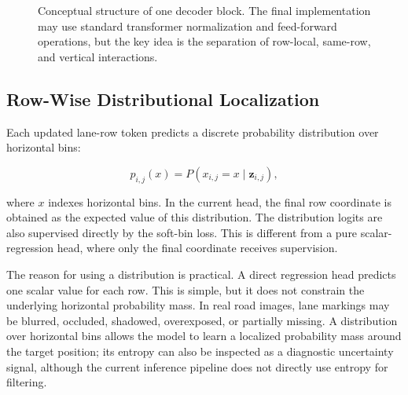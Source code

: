 \documentclass[conference]{IEEEtran}
\begin{document}
\begin{figure}[t]
\centering
{}
\caption{Conceptual structure of one decoder block. The final implementation may use standard transformer normalization and feed-forward operations, but the key idea is the separation of row-local, same-row, and vertical interactions.}
\label{fig:decoderblock}
\end{figure}

\subsection{Row-Wise Distributional Localization}

Each updated lane-row token predicts a discrete probability distribution over horizontal bins:

\begin{equation}
    p_{i,j}(x) = P(x_{i,j}=x \mid \mathbf{z}_{i,j}),
\end{equation}

where $x$ indexes horizontal bins. In the current head, the final row coordinate is obtained as the expected value of this distribution. The distribution logits are also supervised directly by the soft-bin loss. This is different from a pure scalar-regression head, where only the final coordinate receives supervision.

The reason for using a distribution is practical. A direct regression head predicts one scalar value for each row. This is simple, but it does not constrain the underlying horizontal probability mass. In real road images, lane markings may be blurred, occluded, shadowed, overexposed, or partially missing. A distribution over horizontal bins allows the model to learn a localized probability mass around the target position; its entropy can also be inspected as a diagnostic uncertainty signal, although the current inference pipeline does not directly use entropy for filtering.
\end{document}
